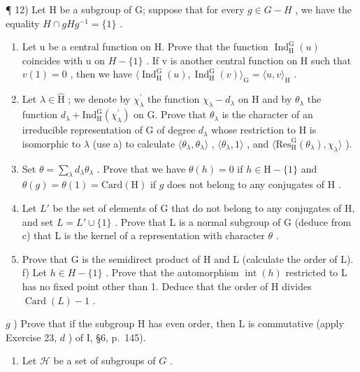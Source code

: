 ¶ 12) Let H be a subgroup of G; suppose that for every \(g \in G - H\) , we have the equality \(H \cap gHg^{-1} = \{1\}\) .

\begin{enumerate}
\def\labelenumi{\alph{enumi})}
\item
  Let u be a central function on H. Prove that the function \(\operatorname{Ind}_{\mathrm{H}}^{\mathrm{G}}(u)\) coincides with u on \(H - \{1\}\) . If v is another central function on H such that \(v(1) = 0\) , then we have \(\langle \operatorname{Ind}_{\mathrm{H}}^{\mathrm{G}}(u), \operatorname{Ind}_{\mathrm{H}}^{\mathrm{G}}(v) \rangle_{\mathrm{G}} = \langle u, v \rangle_{\mathrm{H}}\) .
\item
  Let \(\lambda \in \widehat{\mathrm{H}}\) ; we denote by \(\chi_{\lambda}^{\prime}\) the function \(\chi_{\lambda} - d_{\lambda}\) on H and by \(\theta_{\lambda}\) the function \(d_{\lambda} + \mathrm{Ind}_{\mathrm{H}}^{\mathrm{G}}(\chi_{\lambda}^{\prime})\) on G. Prove that \(\theta_{\lambda}\) is the character of an irreducible representation of G of degree \(d_{\lambda}\) whose restriction to H is isomorphic to \(\lambda\) (use a) to calculate \(\langle\theta_{\lambda},\theta_{\lambda}\rangle\) , \(\langle\theta_{\lambda},1\rangle\) , and \(\langle\mathrm{Res}_{\mathrm{H}}^{\mathrm{G}}(\theta_{\lambda}),\chi_{\lambda}\rangle\) ).
\item
  Set \(\theta = \sum_{\lambda} d_{\lambda} \theta_{\lambda}\) . Prove that we have \(\theta(h) = 0\) if \(h \in \mathrm{H} - \{1\}\) and \(\theta(g) = \theta(1) = \mathrm{Card}(\mathrm{H})\) if \(g\) does not belong to any conjugates of \(\mathrm{H}\) .
\item
  Let \(L'\) be the set of elements of G that do not belong to any conjugates of H, and set \(L = L' \cup \{1\}\) . Prove that L is a normal subgroup of G (deduce from c) that L is the kernel of a representation with character \(\theta\) .
\item
  Prove that G is the semidirect product of H and L (calculate the order of L). f) Let \(h \in H - \{1\}\) . Prove that the automorphism \(\operatorname{int}(h)\) restricted to L has no fixed point other than 1. Deduce that the order of H divides \(\operatorname{Card}(L) - 1\) .
\end{enumerate}

\(g\) ) Prove that if the subgroup H has even order, then L is commutative (apply Exercise 23, \(d\) ) of I, §6, p.~145).

\begin{enumerate}
\def\labelenumi{\arabic{enumi})}
\setcounter{enumi}{12}
\tightlist
\item
  Let \(\mathcal{H}\) be a set of subgroups of \(G\) .
\end{enumerate}

